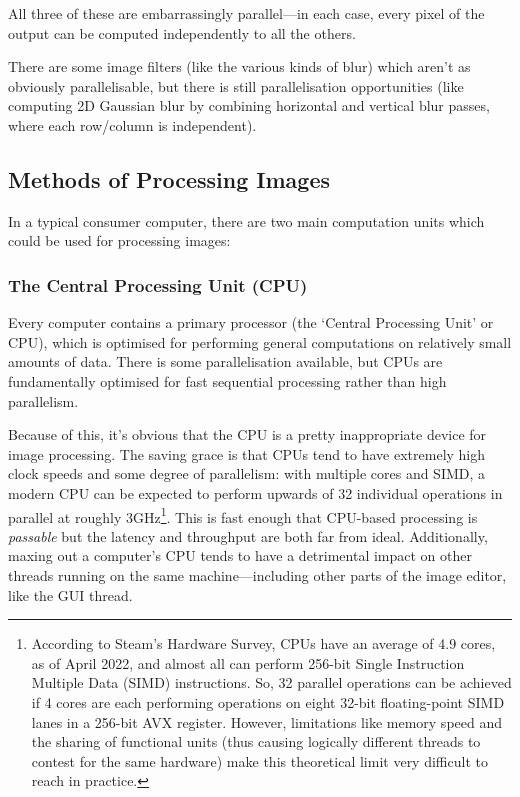 \documentclass[12pt]{article}
\begin{document}
All three of these are embarrassingly parallel---in each case, every pixel of the output can be
computed independently to all the others.

There are some image filters (like the various kinds of blur) which aren't as obviously
parallelisable, but there is still parallelisation opportunities (like computing 2D Gaussian blur by
combining horizontal and vertical blur passes, where each row/column is independent).



\subsection{Methods of Processing Images}\label{sec:compute-types}

In a typical consumer computer, there are two main computation units which could be used for
processing images:

\subsubsection{The Central Processing Unit (CPU)}\label{sec:cpu}

Every computer contains a primary processor (the `Central Processing Unit' or CPU), which is
optimised for performing general computations on relatively small amounts of data.  There is some
parallelisation available, but CPUs are fundamentally optimised for fast sequential processing
rather than high parallelism.

Because of this, it's obvious that the CPU is a pretty inappropriate device for image processing.
The saving grace is that CPUs tend to have extremely high clock speeds and some degree of
parallelism: with multiple cores and SIMD, a modern CPU can be expected to perform upwards of 32
individual operations in parallel at roughly 3GHz\footnote{According to Steam's Hardware Survey,
CPUs have an average of 4.9 cores, as of April 2022, and almost all can perform 256-bit Single
Instruction Multiple Data (SIMD) instructions.  So, 32 parallel operations can be achieved if 4
cores are each performing operations on eight 32-bit floating-point SIMD lanes in a 256-bit AVX
register.  However, limitations like memory speed and the sharing of functional units (thus causing
logically different threads to contest for the same hardware) make this theoretical limit very
difficult to reach in practice.}.  This is fast enough that CPU-based processing is \emph{passable}
but the latency and throughput are both far from ideal.  Additionally, maxing out a computer's CPU
tends to have a detrimental impact on other threads running on the same machine---including other
parts of the image editor, like the GUI thread.
\end{document}
